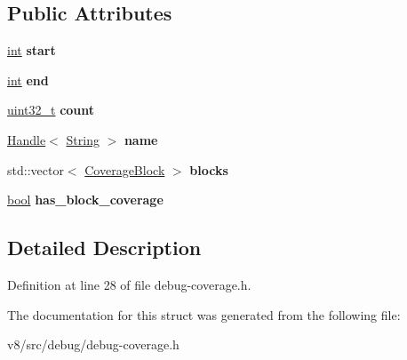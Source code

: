\subsection*{Public Attributes}
\begin{DoxyCompactItemize}
\item 
\mbox{\label{structv8_1_1internal_1_1CoverageFunction_a8b81c0d9f8c755d486c582207f4e0f1e}} 
\mbox{\hyperlink{classint}{int}} {\bfseries start}
\item 
\mbox{\label{structv8_1_1internal_1_1CoverageFunction_ae111ac8978e8f3edb72629f46597478e}} 
\mbox{\hyperlink{classint}{int}} {\bfseries end}
\item 
\mbox{\label{structv8_1_1internal_1_1CoverageFunction_ab8839672abb924bc545c79bd9a7580dd}} 
\mbox{\hyperlink{classuint32__t}{uint32\+\_\+t}} {\bfseries count}
\item 
\mbox{\label{structv8_1_1internal_1_1CoverageFunction_a9db8a79dc9e49a21efbf4f27ec657e37}} 
\mbox{\hyperlink{classv8_1_1internal_1_1Handle}{Handle}}$<$ \mbox{\hyperlink{classv8_1_1internal_1_1String}{String}} $>$ {\bfseries name}
\item 
\mbox{\label{structv8_1_1internal_1_1CoverageFunction_a5850eb8a3fa1922c8067cd5dfbc045a1}} 
std\+::vector$<$ \mbox{\hyperlink{structv8_1_1internal_1_1CoverageBlock}{Coverage\+Block}} $>$ {\bfseries blocks}
\item 
\mbox{\label{structv8_1_1internal_1_1CoverageFunction_a59d2304891b76b8d438561ee87a6078d}} 
\mbox{\hyperlink{classbool}{bool}} {\bfseries has\+\_\+block\+\_\+coverage}
\end{DoxyCompactItemize}


\subsection{Detailed Description}


Definition at line 28 of file debug-\/coverage.\+h.



The documentation for this struct was generated from the following file\+:\begin{DoxyCompactItemize}
\item 
v8/src/debug/debug-\/coverage.\+h\end{DoxyCompactItemize}
